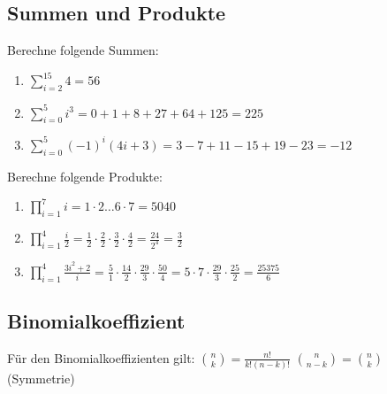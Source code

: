 \documentclass[11pt, a4paper]{article}
\begin{document}
\subsection{Summen und Produkte}
Berechne folgende Summen:
\begin{enumerate}
	\item $\sum_{i=2}^{15} 4 = 56$
	\item $\sum_{i=0}^5 i^3 = 0 + 1 + 8 + 27 + 64 + 125 = 225$
	\item $\sum_{i=0}^5 (-1)^i (4i+3) = 3-7+11-15+19-23 = -12$
\end{enumerate}
Berechne folgende Produkte:
\begin{enumerate}
	\item $\prod_{i=1}^7 i = 1 \cdot 2 \dots 6 \cdot 7 = 5040$
	\item $\prod_{i=1}^4 \frac{i}{2} = \frac{1}{2} \cdot \frac{2}{2} \cdot \frac{3}{2} \cdot \frac{4}{2} = \frac{24}{2^4} = \frac{3}{2}$
	\item $\prod_{i=1}^4 \frac{3i^2+2}{i} = \frac{5}{1} \cdot \frac{14}{2} \cdot \frac{29}{3} \cdot \frac{50}{4} = 5 \cdot 7 \cdot \frac{29}{3} \cdot \frac{25}{2} = \frac{25375}{6}$
\end{enumerate}

\subsection{Binomialkoeffizient}
Für den Binomialkoeffizienten gilt:
$\binom{n}{k} = \frac{n!}{k!(n-k)!}$ \qquad $\binom{n}{n-k} = \binom{n}{k}$ (Symmetrie)
\end{document}
